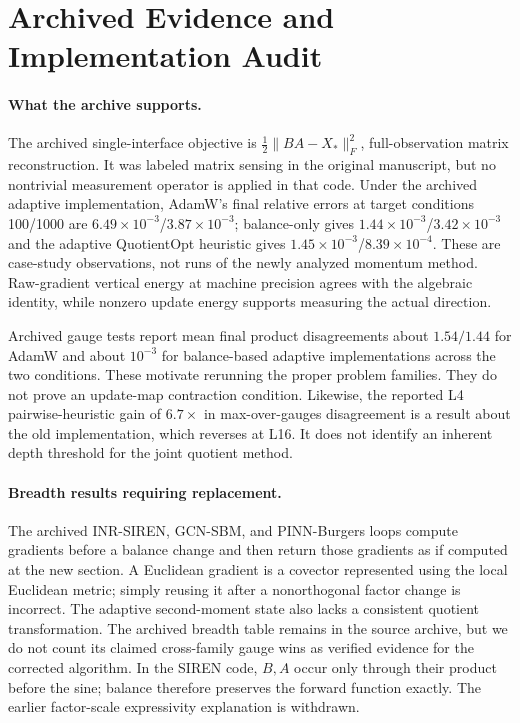 \section{Archived Evidence and Implementation Audit}
\label{app:archive-evidence}
\paragraph{What the archive supports.}
The archived single-interface objective is $\tfrac12\|BA-X_*\|_F^2$, full-observation matrix reconstruction. It was labeled matrix sensing in the original manuscript, but no nontrivial measurement operator is applied in that code. Under the archived adaptive implementation, AdamW's final relative errors at target conditions 100/1000 are $6.49\times10^{-3}$/$3.87\times10^{-3}$; balance-only gives $1.44\times10^{-3}$/$3.42\times10^{-3}$ and the adaptive QuotientOpt heuristic gives $1.45\times10^{-3}$/$8.39\times10^{-4}$. These are case-study observations, not runs of the newly analyzed momentum method. Raw-gradient vertical energy at machine precision agrees with the algebraic identity, while nonzero update energy supports measuring the actual direction.



Archived gauge tests report mean final product disagreements about $1.54/1.44$ for AdamW and about $10^{-3}$ for balance-based adaptive implementations across the two conditions. These motivate rerunning the proper problem families. They do not prove an update-map contraction condition. Likewise, the reported L4 pairwise-heuristic gain of $6.7\times$ in max-over-gauges disagreement is a result about the old implementation, which reverses at L16. It does not identify an inherent depth threshold for the joint quotient method.

\paragraph{Breadth results requiring replacement.}
The archived INR-SIREN, GCN-SBM, and PINN-Burgers loops compute gradients before a balance change and then return those gradients as if computed at the new section. A Euclidean gradient is a covector represented using the local Euclidean metric; simply reusing it after a nonorthogonal factor change is incorrect. The adaptive second-moment state also lacks a consistent quotient transformation. The archived breadth table remains in the source archive, but we do not count its claimed cross-family gauge wins as verified evidence for the corrected algorithm. In the SIREN code, $B,A$ occur only through their product before the sine; balance therefore preserves the forward function exactly. The earlier factor-scale expressivity explanation is withdrawn.

